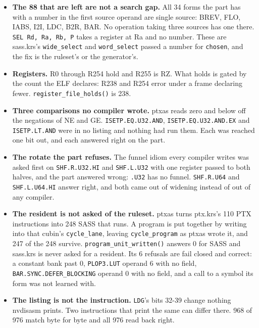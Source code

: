 \begin{enumerate}
\begin{itemize}
\item \textbf{The 88 that are left are not a search gap.} All 34 forms the part has with a number in the first source operand are single source: BREV, FLO, IABS, I2I, LDC, B2R, BAR. No operation taking three sources has one there. \texttt{SEL Rd, Ra, Rb, P} takes a register at Ra and no number. These are sass.krs's \texttt{wide\_\allowbreak{}select} and \texttt{word\_\allowbreak{}select} passed a number for \texttt{chosen}, and the fix is the ruleset's or the generator's.
\item \textbf{Registers.} R0 through R254 hold and R255 is RZ. What holds is gated by the count the ELF declares: R238 and R254 error under a frame declaring fewer. \texttt{register\_\allowbreak{}file\_\allowbreak{}holds()} is 238.
\item \textbf{Three comparisons no compiler wrote.} ptxas reads zero and below off the negations of NE and GE. \texttt{ISETP.\allowbreak{}EQ.\allowbreak{}U32.\allowbreak{}AND}, \texttt{ISETP.\allowbreak{}EQ.\allowbreak{}U32.\allowbreak{}AND.\allowbreak{}EX} and \texttt{ISETP.\allowbreak{}LT.\allowbreak{}AND} were in no listing and nothing had run them. Each was reached one bit out, and each answered right on the part.
\item \textbf{The rotate the part refuses.} The funnel idiom every compiler writes was asked first on \texttt{SHF.\allowbreak{}R.\allowbreak{}U32.\allowbreak{}HI} and \texttt{SHF.\allowbreak{}L.\allowbreak{}U32} with one register passed to both halves, and the part answered wrong: \texttt{.\allowbreak{}U32} has no funnel. \texttt{SHF.\allowbreak{}R.\allowbreak{}U64} and \texttt{SHF.\allowbreak{}L.\allowbreak{}U64.\allowbreak{}HI} answer right, and both came out of widening instead of out of any compiler.
\item \textbf{The resident is not asked of the ruleset.} ptxas turns ptx.krs's 110 PTX instructions into 248 SASS that runs. A program is put together by writing into that cubin's \texttt{cycle\_\allowbreak{}lane}, leaving \texttt{cycle\_\allowbreak{}program} as ptxas wrote it, and 247 of the 248 survive. \texttt{program\_\allowbreak{}unit\_\allowbreak{}written()} answers 0 for SASS and sass.krs is never asked for a resident. Its 6 refusals are fail closed and correct: a constant bank past 0, \texttt{PLOP3.\allowbreak{}LUT} operand 6 with no field, \texttt{BAR.\allowbreak{}SYNC.\allowbreak{}DEFER\_\allowbreak{}BLOCKING} operand 0 with no field, and a call to a symbol its form was not learned with.
\item \textbf{The listing is not the instruction.} \texttt{LDG}'s bits 32-39 change nothing nvdisasm prints. Two instructions that print the same can differ there. 968 of 976 match byte for byte and all 976 read back right.

\end{itemize}
\end{enumerate}

